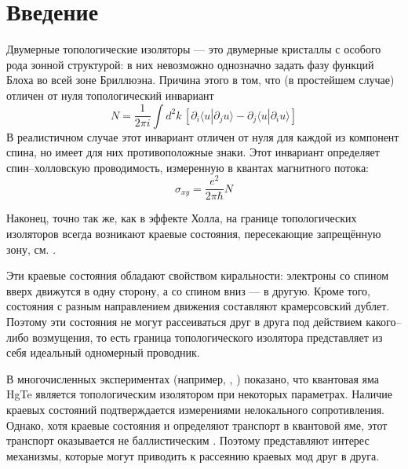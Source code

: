 	\newpage
	\section{Введение}
    Двумерные топологические изоляторы --- это двумерные кристаллы 
    с особого рода зонной структурой:
    в них невозможно однозначно задать фазу функций 
    Блоха во всей зоне Бриллюэна. Причина этого в том, что (в простейшем случае) 
    отличен от нуля
    топологический инвариант \cite{Kohmoto1985}
    \begin{equation}
        \label{TKNN}
        N = \frac{1}{2\pi i} 
            \int d^2 k\, \left[\partial_i \langle u | \partial_j u \rangle -
            \partial_j \langle u | \partial_i u \rangle \right]
    \end{equation}
    В реалистичном случае этот инвариант отличен от нуля для каждой из компонент спина,
    но имеет для них противоположные знаки.
    Этот инвариант определяет спин--холловскую проводимость, 
    измеренную в квантах 
    магнитного потока:
    \begin{equation}
        \sigma_{xy} = \frac{e^2}{2\pi \hbar} N
    \end{equation}
    
    Наконец, точно так же, как в эффекте Холла, 
    на границе топологических изоляторов всегда возникают краевые состояния,
    пересекающие запрещённую зону, см. \cite{Hasan2010}.

    Эти краевые состояния обладают свойством киральности: электроны со спином 
    вверх движутся в одну сторону, а со спином вниз --- в другую. Кроме того, состояния 
    с разным направлением движения составляют крамерсовский дублет. Поэтому
    эти состояния не могут рассеиваться друг в друга 
    под действием какого--либо возмущения, то есть граница топологического 
    изолятора представляет из себя идеальный одномерный проводник.

    В многочисленных экспериментах (например, \cite{Konig2007}, \cite{Gusev2011})
    показано, что квантовая яма HgTe является топологическим изолятором при 
    некоторых параметрах. Наличие краевых состояний подтверждается измерениями
    нелокального сопротивления. Однако, хотя краевые состояния и
    определяют транспорт в квантовой яме, этот транспорт оказывается не баллистическим 
    \cite{Gusev2011}.
    Поэтому представляют интерес механизмы, которые могут приводить
    к рассеянию краевых мод друг в друга.

